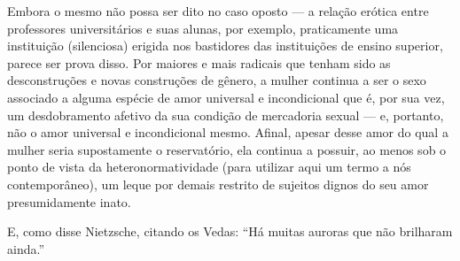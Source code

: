 Embora o mesmo não possa ser dito no caso oposto --- a relação
erótica entre professores universitários e suas alunas, por exemplo,
praticamente uma instituição (silenciosa) erigida nos bastidores das
instituições de ensino superior, parece ser prova disso. Por maiores e
mais radicais que tenham sido as desconstruções e novas construções de
gênero, a mulher continua a ser o sexo associado a alguma espécie de
amor universal e incondicional que é, por sua vez, um desdobramento
afetivo da sua condição de mercadoria sexual --- e, portanto, não o amor
universal e incondicional mesmo. Afinal, apesar desse amor do qual a
mulher seria supostamente o reservatório, ela continua a possuir, ao
menos sob o ponto de vista da heteronormatividade (para utilizar aqui um
termo a nós contemporâneo), um leque por demais restrito de sujeitos
dignos do seu amor presumidamente inato.

E, como disse Nietzsche, citando os Vedas: ``Há muitas auroras que não
brilharam ainda.''

